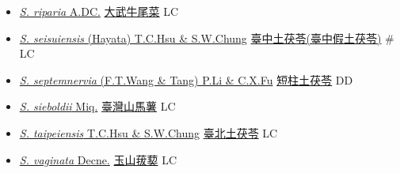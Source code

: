 \begin{itemize}
\begin{itemize}
        \item[] \href{http://www.theplantlist.org/tpl1.1/search?q=Smilax+riparia}{\textit{S. riparia} A.DC.}   \href{\detokenize{http://taibnet.sinica.edu.tw/chi/taibnet_species_list.php?T2=大武牛尾菜&T2_new_value=true&fr=y}}{大武牛尾菜} LC
        \item[] \href{http://www.theplantlist.org/tpl1.1/search?q=Smilax+seisuiensis}{\textit{S. seisuiensis} (Hayata) T.C.Hsu \& S.W.Chung}     \href{\detokenize{http://taibnet.sinica.edu.tw/chi/taibnet_species_list.php?T2=臺中土茯苓&T2_new_value=true&fr=y}}{臺中土茯苓(臺中假土茯苓)}  \# LC
        \item[] \href{http://www.theplantlist.org/tpl1.1/search?q=Smilax+septemnervia}{\textit{S. septemnervia} (F.T.Wang \& Tang) P.Li \& C.X.Fu}     \href{\detokenize{http://taibnet.sinica.edu.tw/chi/taibnet_species_list.php?T2=短柱土茯苓&T2_new_value=true&fr=y}}{短柱土茯苓} DD
        \item[] \href{http://www.theplantlist.org/tpl1.1/search?q=Smilax+sieboldii}{\textit{S. sieboldii} Miq.}   \href{\detokenize{http://taibnet.sinica.edu.tw/chi/taibnet_species_list.php?T2=臺灣山馬薯&T2_new_value=true&fr=y}}{臺灣山馬薯} LC
        \item[] \href{http://www.theplantlist.org/tpl1.1/search?q=Smilax+taipeiensis}{\textit{S. taipeiensis} T.C.Hsu \& S.W.Chung}   \href{\detokenize{http://taibnet.sinica.edu.tw/chi/taibnet_species_list.php?T2=臺北土茯苓&T2_new_value=true&fr=y}}{臺北土茯苓} LC
        \item[] \href{http://www.theplantlist.org/tpl1.1/search?q=Smilax+vaginata}{\textit{S. vaginata} Decne.}   \href{\detokenize{http://taibnet.sinica.edu.tw/chi/taibnet_species_list.php?T2=玉山菝葜&T2_new_value=true&fr=y}}{玉山菝葜} LC
  \end{itemize}
  \end{itemize}
